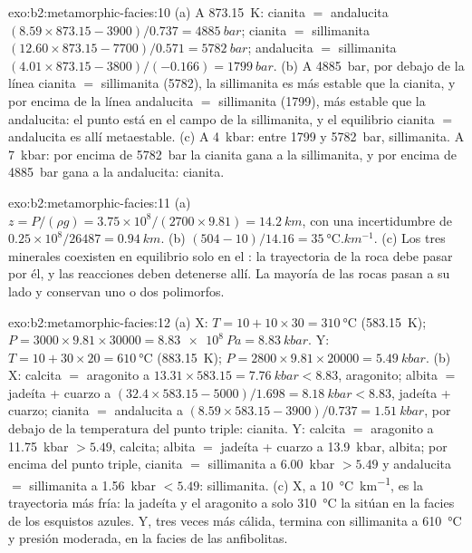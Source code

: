 \begin{solution}{exo:b2:metamorphic-facies:10}
(a) A \qty{873.15}{K}: cianita $=$ andalucita $(8.59\times873.15 - 3900)/0.737 =
\qty{4885}{bar}$; cianita $=$ sillimanita $(12.60\times873.15 - 7700)/0.571 =
\qty{5782}{bar}$; andalucita $=$ sillimanita $(4.01\times873.15 - 3800)/(-0.166) =
\qty{1799}{bar}$. (b) A \qty{4885}{bar}, por debajo de la línea cianita $=$ sillimanita (5782),
la sillimanita es más estable que la cianita, y por encima de la línea andalucita $=$ sillimanita
(1799), más estable que la andalucita: el punto está en el campo de la sillimanita, y el
equilibrio cianita $=$ andalucita es allí metaestable. (c) A \qty{4}{kbar}: entre 1799
y \qty{5782}{bar}, sillimanita. A \qty{7}{kbar}: por encima de \qty{5782}{bar} la cianita gana a la
sillimanita, y por encima de \qty{4885}{bar} gana a la andalucita: cianita.
\end{solution}

\begin{solution}{exo:b2:metamorphic-facies:11}
(a) $z = P/(\rho g) = 3.75\times10^8/(2700\times9.81) = \qty{14.2}{km}$, con una incertidumbre de
$0.25\times10^8/26487 = \qty{0.94}{km}$. (b) $(504 - 10)/14.16 =
\qty{35}{\celsius.km^{-1}}$. (c) Los tres minerales coexisten en equilibrio solo en el
: la trayectoria de la roca debe pasar por él, y las reacciones deben
detenerse allí. La mayoría de las rocas pasan a su lado y conservan uno o dos polimorfos.
\end{solution}

\begin{solution}{exo:b2:metamorphic-facies:12}
(a) X: $T = 10 + 10\times30 = \qty{310}{\celsius}$ (\qty{583.15}{K}); $P = 3000\times
9.81\times30000 = \qty{8.83e8}{Pa} = \qty{8.83}{kbar}$. Y: $T = 10 + 30\times20 =
\qty{610}{\celsius}$ (\qty{883.15}{K}); $P = 2800\times9.81\times20000 = \qty{5.49}{kbar}$.
(b) X: calcita $=$ aragonito a $13.31\times583.15 = \qty{7.76}{kbar} < 8.83$, aragonito;
albita $=$ jadeíta + cuarzo a $(32.4\times583.15 - 5000)/1.698 = \qty{8.18}{kbar} <
8.83$, jadeíta + cuarzo; cianita $=$ andalucita a $(8.59\times583.15 - 3900)/0.737 =
\qty{1.51}{kbar}$, por debajo de la temperatura del punto triple: cianita. Y: calcita $=$
aragonito a \qty{11.75}{kbar} $> 5.49$, calcita; albita $=$ jadeíta + cuarzo a
\qty{13.9}{kbar}, albita; por encima del punto triple, cianita $=$ sillimanita a
\qty{6.00}{kbar} $> 5.49$ y andalucita $=$ sillimanita a \qty{1.56}{kbar} $< 5.49$:
sillimanita. (c) X, a \qty{10}{\celsius\per\km}, es la trayectoria más fría: la jadeíta y el
aragonito a solo \qty{310}{\celsius} la sitúan en la facies de los esquistos azules. Y, tres veces
más cálida, termina con sillimanita a \qty{610}{\celsius} y presión moderada, en la
facies de las anfibolitas.
\end{solution}

